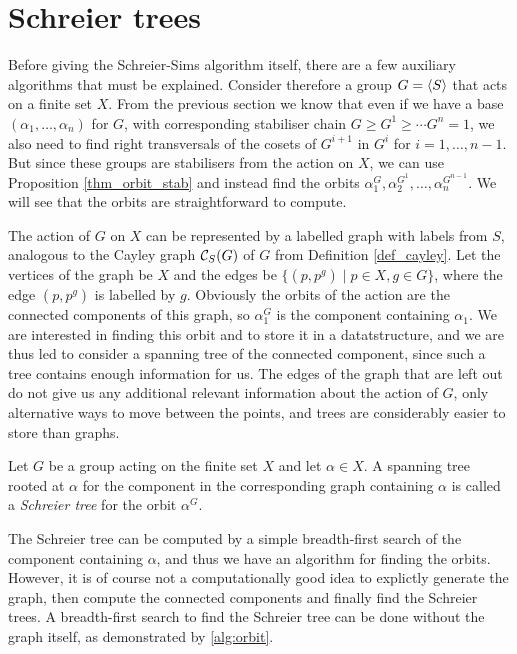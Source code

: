 \section{Schreier trees}
Before giving the Schreier-Sims algorithm itself, there are a few
auxiliary algorithms that must be explained. Consider therefore a
group $G = \left\langle S \right\rangle$ that acts on a finite set $X$. From the previous
section we know that even if we have a base $(\alpha_1, \dotsc,
\alpha_n)$ for $G$, with corresponding stabiliser chain $G \geq G^1
\geq \dotsb G^n = 1$, we also need to find right transversals of the cosets of
$G^{i + 1}$ in $G^i$ for $i = 1, \dotsc, n - 1$. But since these groups
are stabilisers from the action on $X$, we can use Proposition
\ref{thm_orbit_stab} and instead find the orbits $\alpha_1^G,
\alpha_2^{G^1}, \dotsc, \alpha_n^{G^{n - 1}}$. We will see that the orbits are straightforward to compute.

The action of $G$ on $X$ can be represented by a labelled graph with
labels from $S$, analogous to the Cayley graph $\mathcal{C}_S(G)$ of $G$ from
Definition \ref{def_cayley}. Let the vertices of the graph be $X$ and the edges
be $\{(p, p^g) \mid p \in X, g \in G\}$, where the edge $(p, p^g)$ is
labelled by $g$. Obviously the orbits of the action are the connected
components of this graph, so $\alpha_1^G$ is the component containing
$\alpha_1$. We are interested in finding this orbit and to store it in
a datatstructure, and we are thus led to consider a spanning tree of
the connected component, since such a tree contains enough information
for us. The edges of the graph that are left out do not give us any
additional relevant information about the action of $G$, only
alternative ways to move between the points, and trees are
considerably easier to store than graphs.

\begin{deff} \label{def_bsgs}
  Let $G$ be a group acting on the finite set $X$ and let $\alpha \in
  X$. A spanning tree rooted at $\alpha$ for the component in the corresponding graph
  containing $\alpha$ is called a
  \emph{Schreier tree} for the orbit $\alpha^G$.
\end{deff}

The Schreier tree can be computed by a simple breadth-first search of
the component containing $\alpha$, and thus we have an algorithm for
finding the orbits. However, it is of course not a computationally
good idea to explictly generate the graph, then compute the connected
components and finally find the Schreier trees. A breadth-first search
to find the Schreier tree can be done without the graph itself, as
demonstrated by \ref{alg:orbit}.

